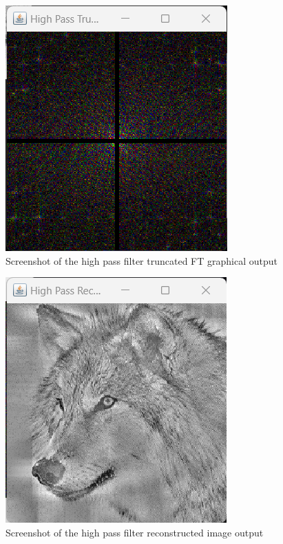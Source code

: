       \begin{figure}[H]
        \centering
        \includegraphics[width=0.8\columnwidth]{Figures/Week 1/W1-High-Pass-Truncated.png}
        \caption{Screenshot of the high pass filter truncated FT graphical output}
        \label{fig:High-Pass-Filter-Truncated}
      \end{figure}

      \begin{figure}[H]
        \centering
        \includegraphics[width=0.8\columnwidth]{Figures/Week 1/W1-High-Pass-Reconstructed.png}
        \caption{Screenshot of the high pass filter reconstructed image output}
        \label{fig:High-Pass-Filter-Image}
      \end{figure}


